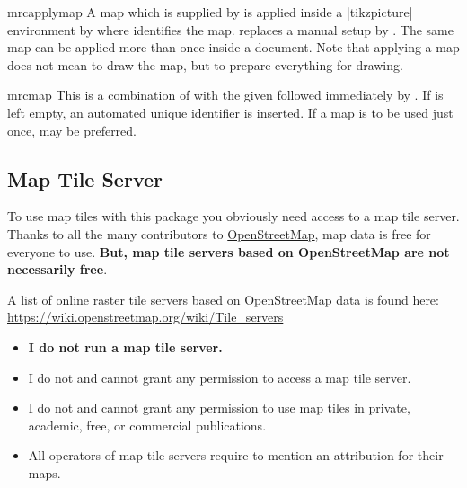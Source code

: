 \begin{docCommand}{mrcapplymap}{}
  A map which is supplied by  is applied
  inside a |tikzpicture| environment by
   where  identifies the map.
   replaces a manual setup by .
  The same map can be applied more than once inside a document.
  Note that applying a map does not mean to draw the map, but to prepare
  everything for drawing.
\end{docCommand}


\begin{docCommand}{mrcmap}{}
  This is a combination of
   with the given 
  followed immediately by .
  If  is left empty, an automated unique identifier is
  inserted.
  If a map is to be used just once,  may be preferred.
\end{docCommand}





\clearpage
\subsection{Map Tile Server}\label{sec:maptileserver}


To use map tiles with this package you obviously need access to a map tile server.
Thanks to all the many contributors to
\href{https://openstreetmap.org/copyright}{OpenStreetMap},
map data is free for everyone to use.
\textbf{But, map tile servers based on OpenStreetMap are not necessarily free}.

A list of online raster tile servers based on OpenStreetMap data is found here:\\
\url{https://wiki.openstreetmap.org/wiki/Tile_servers}

\begin{itemize}
\item\bfseries I do not run a map tile server.
\item I do not and cannot grant any permission to access a map tile server.
\item I do not and cannot grant any permission to use map tiles in
  private, academic, free, or commercial publications.
\item All operators of map tile servers require to mention an attribution
  for their maps.
\end{itemize}

